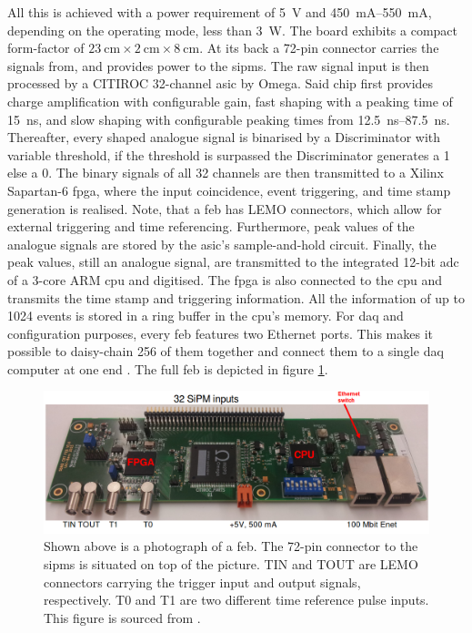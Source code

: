 All this is achieved with a power requirement of \SI{5}{\volt} and \SIrange{450}{550}{\milli\ampere}, depending on the operating mode, \ie less than \SI{3}{\watt}. The board exhibits a compact form-factor of $\SI{23}{\centi\metre} \times \SI{2}{\centi\metre} \times \SI{8}{\centi\metre}$. At its back a \num{72}-pin connector carries the signals from, and provides power to the \glspl{sipm}. The raw signal input is then processed by a CITIROC \num{32}-channel \gls{asic} by Omega. Said chip first provides charge amplification with configurable gain, fast shaping with a peaking time of \SI{15}{\nano\second}, and slow shaping with configurable peaking times from \SIrange{12.5}{87.5}{\nano\second}. Thereafter, every shaped analogue signal is binarised by a \gls{Discriminator} with variable threshold, \ie if the threshold is surpassed the \gls{Discriminator} generates a \num{1} else a \num{0}. The binary signals of all \num{32} channels are then transmitted to a Xilinx Sapartan-6 \gls{fpga}, where the input  coincidence, event triggering, and time stamp generation is realised. Note, that a \gls{feb} has LEMO connectors, which allow for external triggering and time referencing. Furthermore, peak values of the analogue signals are stored by the \gls{asic}'s sample-and-hold circuit. Finally, the peak values, still an analogue signal, are transmitted to the integrated \num{12}-bit \gls{adc} of a \num{3}-core ARM \gls{cpu} and digitised. The \gls{fpga} is also connected to the \gls{cpu} and transmits the time stamp and triggering information. All the information of up to \num{1024} events is stored in a ring buffer in the \gls{cpu}'s memory. For \gls{daq} and configuration purposes, every \gls{feb} features two Ethernet ports. This makes it possible to daisy-chain \num{256} of them together and connect them to a single \gls{daq} computer at one end \cite{CRTFrontEndElectronics}. The full \gls{feb} is depicted in figure \ref{fig:FEB}.
\begin{figure}[htbp]
    \centering
    \includegraphics[width=1.0\textwidth]{images/MicroBooNE/FEB.png}
    \caption[Front-End Electronics Board]{Shown above is a photograph of a \gls{feb}. The \num{72}-pin connector to the \glspl{sipm} is situated on top of the picture. TIN and TOUT are LEMO connectors carrying the trigger input and output signals, respectively. T0 and T1 are two different time reference pulse inputs. This figure is sourced from \cite{CRTFrontEndElectronics}.}
    \label{fig:FEB}
\end{figure}

